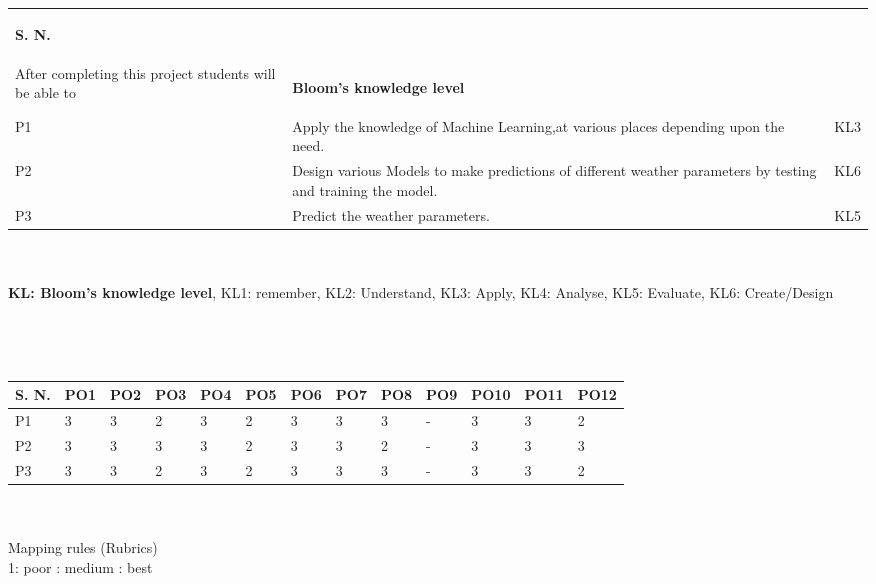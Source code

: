 \section*{}
	\begin{tabular}{|p{1cm}|p{12cm}|p{2cm}|}
			\hline
			\begin{center}
				\textbf{S. N.}
			\end{center} &\begin{center}
				 \textbf{Project outcomes}\\ \vspace*{1mm} After completing this project students will be able to
			\end{center} & \begin{center}
				\textbf{Bloom's knowledge level}
			\end{center} \\ 
			\hline
			P1 & Apply the knowledge of Machine Learning,at various places depending upon the need.  
    & KL3 \\ \hline
			P2 & Design various Models to make predictions of different weather parameters by testing and training the model. &  KL6\\ \hline
			P3 & Predict the weather parameters.  & KL5\\ \hline
		\end{tabular}
\\
\\
\textbf{KL: Bloom’s knowledge level}, KL1: remember, KL2: Understand, KL3: Apply, KL4: Analyse, KL5: Evaluate, KL6: Create/Design
\\
\\
\\
	\section*{}
	\begin{tabular}{|p{1.35cm}|p{0.75cm}|p{0.75cm}|p{0.75cm}|p{0.75cm}|p{0.75cm}|p{0.75cm}|p{0.75cm}|p{0.80cm}|p{0.80cm}|p{0.80cm}|p{0.80cm}|p{0.80cm}|}
	\hline
	\textbf{S. N.} &\textbf{PO1} &	\textbf{PO2} & \textbf{PO3} & \textbf{PO4} & \textbf{PO5} & \textbf{PO6} & \textbf{PO7} & \textbf{PO8} & \textbf{PO9} & \textbf{PO10} & \textbf{PO11} & \textbf{PO12} \\
	\hline
    P1	& 3 & 3 & 2 & 3 & 2 & 3 &3  &3  &-  &3  &3  &2   \\
    \hline
    P2	& 3 & 3 & 3 & 3 & 2 & 3 &3  &2  &-  &3  &3  &3   \\
    \hline
    P3	& 3 & 3 & 2 & 3 & 2 & 3 &3  &3  &-  &3  &3  &2   \\
    \hline
		\end{tabular}
\\ 
\\ Mapping rules (Rubrics)
\\
1: poor  : medium : best
\pagebreak


